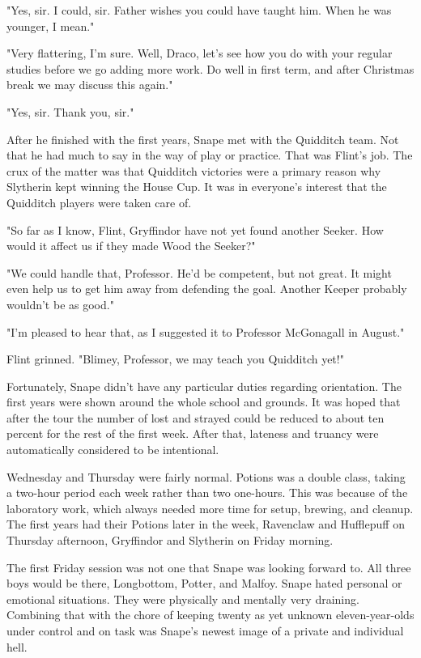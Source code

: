 \documentclass[a4paper,11pt]{article}
\begin{document}
"Yes, sir. I could, sir. Father wishes you could have taught him. When he was younger, I mean."

"Very flattering, I'm sure. Well, Draco, let's see how you do with your regular studies before we go adding more work. Do well in first term, and after Christmas break we may discuss this again."

"Yes, sir. Thank you, sir."

After he finished with the first years, Snape met with the Quidditch team. Not that he had much to say in the way of play or practice. That was Flint's job. The crux of the matter was that Quidditch victories were a primary reason why Slytherin kept winning the House Cup. It was in everyone's interest that the Quidditch players were taken care of.

"So far as I know, Flint, Gryffindor have not yet found another Seeker. How would it affect us if they made Wood the Seeker?"

"We could handle that, Professor. He'd be competent, but not great. It might even help us to get him away from defending the goal. Another Keeper probably wouldn't be as good."

"I'm pleased to hear that, as I suggested it to Professor McGonagall in August."

Flint grinned. "Blimey, Professor, we may teach you Quidditch yet!"

Fortunately, Snape didn't have any particular duties regarding orientation. The first years were shown around the whole school and grounds. It was hoped that after the tour the number of lost and strayed could be reduced to about ten percent for the rest of the first week. After that, lateness and truancy were automatically considered to be intentional.

Wednesday and Thursday were fairly normal. Potions was a double class, taking a two-hour period each week rather than two one-hours. This was because of the laboratory work, which always needed more time for setup, brewing, and cleanup. The first years had their Potions later in the week, Ravenclaw and Hufflepuff on Thursday afternoon, Gryffindor and Slytherin on Friday morning.

The first Friday session was not one that Snape was looking forward to. All three boys would be there, Longbottom, Potter, and Malfoy. Snape hated personal or emotional situations. They were physically and mentally very draining. Combining that with the chore of keeping twenty as yet unknown eleven-year-olds under control and on task was Snape's newest image of a private and individual hell.
\end{document}
